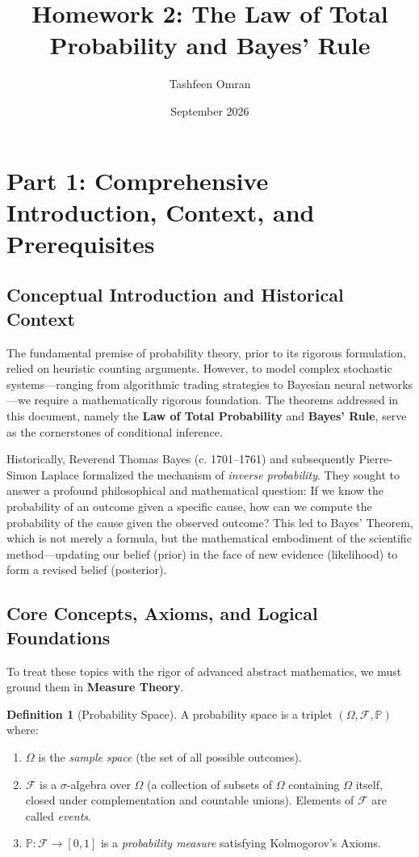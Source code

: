 \documentclass[12pt]{article}
\title{\textbf{Homework 2: The Law of Total Probability and Bayes' Rule}}
\author{Tashfeen Omran}
\date{September 2026}
\theoremstyle{definition}
\newtheorem{definition}{Definition}[section]
\theoremstyle{remark}
\newcommand{\Pbb}{\mathbb{P}}
\newcommand{\Fcal}{\mathcal{F}}
\newcommand{\OmegaSet}{\Omega}
\begin{document}
\maketitle
\tableofcontents
\newpage

\section{Part 1: Comprehensive Introduction, Context, and Prerequisites}

\subsection{Conceptual Introduction and Historical Context}
The fundamental premise of probability theory, prior to its rigorous formulation, relied on heuristic counting arguments. However, to model complex stochastic systems—ranging from algorithmic trading strategies to Bayesian neural networks—we require a mathematically rigorous foundation. The theorems addressed in this document, namely the \textbf{Law of Total Probability} and \textbf{Bayes' Rule}, serve as the cornerstones of conditional inference. 

Historically, Reverend Thomas Bayes (c. 1701--1761) and subsequently Pierre-Simon Laplace formalized the mechanism of \textit{inverse probability}. They sought to answer a profound philosophical and mathematical question: If we know the probability of an outcome given a specific cause, how can we compute the probability of the cause given the observed outcome? This led to Bayes' Theorem, which is not merely a formula, but the mathematical embodiment of the scientific method—updating our belief (prior) in the face of new evidence (likelihood) to form a revised belief (posterior).

\subsection{Core Concepts, Axioms, and Logical Foundations}
To treat these topics with the rigor of advanced abstract mathematics, we must ground them in \textbf{Measure Theory}. 

\begin{definition}[Probability Space]
A probability space is a triplet $(\OmegaSet, \Fcal, \Pbb)$ where:
\begin{enumerate}
    \item $\OmegaSet$ is the \textit{sample space} (the set of all possible outcomes).
    \item $\Fcal$ is a $\sigma$-algebra over $\OmegaSet$ (a collection of subsets of $\OmegaSet$ containing $\OmegaSet$ itself, closed under complementation and countable unions). Elements of $\Fcal$ are called \textit{events}.
    \item $\Pbb: \Fcal \to [0, 1]$ is a \textit{probability measure} satisfying Kolmogorov's Axioms.
\end{enumerate}
\end{definition}
\end{document}
